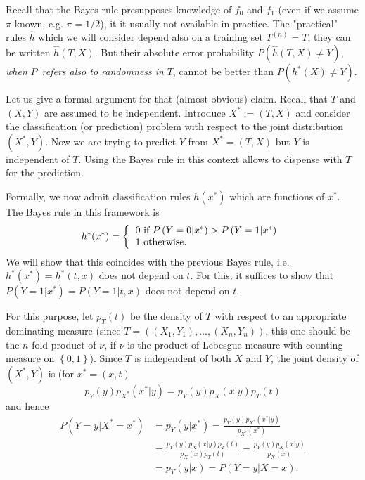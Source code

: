 \documentclass[11pt,twoside]{article}%
\theoremstyle{change}
\begin{document}
\bigskip

Recall that the Bayes rule presupposes knowledge of $f_{0}$ and $f_{1}$ (even
if we assume $\pi$ known, e.g. $\pi=1/2$), it it usually not available in
practice. The "practical" rules $\hat{h}$ which we will consider depend also
on a training set $T^{(n)}=T$, they can be written $\hat{h}\left(  T,X\right)
$. But their absolute error probability $P\left(  \hat{h}\left(  T,X\right)
\neq Y\right)  ,$ \textit{when }$P$\textit{\ refers also to randomness in }%
$T$, cannot be better than $P\left(  h^{\ast}(X)\neq Y\right)  $.

Let us give a formal argument for that (almost obvious) claim. Recall that $T
$ and $\left(  X,Y\right)  $ are assumed to be independent. Introduce
$X^{\ast}:=\left(  T,X\right)  $ and consider the classification (or
prediction) problem with respect to the joint distribution $\left(  X^{\ast
},Y\right)  $. Now we are trying to predict $Y$ from $X^{\ast}=\left(
T,X\right)  $ but $Y$ is independent of $T$. Using the Bayes rule in this
context allows to dispense with $T$ for the prediction.

Formally, we now admit classification rules $h(x^{\ast})$ which are functions
of $x^{\ast}$. The Bayes rule in this framework is
\begin{equation}
h^{\ast}(x^{\ast})=\left\{
\begin{tabular}
[c]{l}%
$0$ if $P\left(  Y=0|x^{\ast}\right)  >P\left(  Y=1|x^{\ast}\right)  $\\
$1$ otherwise$.$%
\end{tabular}
\right. \label{bayes-rule-extend}%
\end{equation}
We will show that this coincides with the previous Bayes rule, i.e. $h^{\ast
}(x^{\ast})=h^{\ast}(t,x)$ does not depend on $t$. For this, it suffices to
show that $P\left(  Y=1|x^{\ast}\right)  =P\left(  Y=1|t,x\right)  $ does not
depend on $t.$

For this purpose, let $p_{T}(t)$ be the density of $T$ with respect to an
appropriate dominating measure (since $T=\left(  \left(  X_{1},Y_{1}\right)
,\ldots,\left(  X_{n},Y_{n}\right)  \right)  $, this one should be the
$n$-fold product of $\nu$, if $\nu$ is the product of Lebesgue measure with
counting measure on $\left\{  0,1\right\}  $). Since $T$ is independent of
both $X$ and $Y$, the joint density of $\left(  X^{\ast},Y\right)  $ is (for
$x^{\ast}=(x,t)$
\[
p_{Y}(y)p_{X^{\ast}}(x^{\ast}|y)=p_{Y}(y)p_{X}(x|y)p_{T}(t)
\]
and hence
\begin{align*}
P\left(  Y=y|X^{\ast}=x^{\ast}\right)   & =p_{Y}(y|x^{\ast})=\frac
{p_{Y}(y)p_{X^{\ast}}(x^{\ast}|y)}{p_{X^{\ast}}(x^{\ast})}\\
& =\frac{p_{Y}(y)p_{X}(x|y)p_{T}(t)}{p_{X}(x)p_{T}(t)}=\frac{p_{Y}%
(y)p_{X}(x|y)}{p_{X}(x)}\\
& =p_{Y}(y|x)=P\left(  Y=y|X=x\right)  .
\end{align*}
\end{document}
